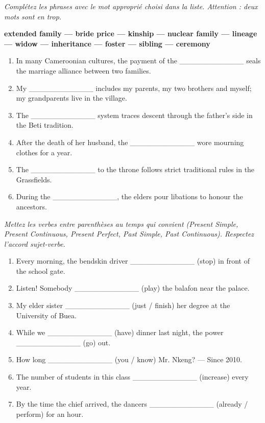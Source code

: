 \documentclass[11pt]{article}
\begin{document}
\begin{exercice}
\emph{Complétez les phrases avec le mot approprié choisi dans la liste. Attention : deux mots sont en trop.}
\begin{center}
\textbf{extended family — bride price — kinship — nuclear family — lineage — widow — inheritance — foster — sibling — ceremony}
\end{center}
\begin{enumerate}
    \item In many Cameroonian cultures, the payment of the \_\_\_\_\_\_\_\_\_\_\_\_ seals the marriage alliance between two families.
    \item My \_\_\_\_\_\_\_\_\_\_\_\_ includes my parents, my two brothers and myself; my grandparents live in the village.
    \item The \_\_\_\_\_\_\_\_\_\_\_\_ system traces descent through the father's side in the Beti tradition.
    \item After the death of her husband, the \_\_\_\_\_\_\_\_\_\_\_\_ wore mourning clothes for a year.
    \item The \_\_\_\_\_\_\_\_\_\_\_\_ to the throne follows strict traditional rules in the Grassfields.
    \item During the \_\_\_\_\_\_\_\_\_\_\_\_, the elders pour libations to honour the ancestors.
\end{enumerate}
\end{exercice}

\begin{exercice}
\emph{Mettez les verbes entre parenthèses au temps qui convient (Present Simple, Present Continuous, Present Perfect, Past Simple, Past Continuous). Respectez l'accord sujet-verbe.}
\begin{enumerate}
    \item Every morning, the bendskin driver \_\_\_\_\_\_\_\_\_\_\_\_ (stop) in front of the school gate.
    \item Listen! Somebody \_\_\_\_\_\_\_\_\_\_\_\_ (play) the balafon near the palace.
    \item My elder sister \_\_\_\_\_\_\_\_\_\_\_\_ (just / finish) her degree at the University of Buea.
    \item While we \_\_\_\_\_\_\_\_\_\_\_\_ (have) dinner last night, the power \_\_\_\_\_\_\_\_\_\_\_\_ (go) out.
    \item How long \_\_\_\_\_\_\_\_\_\_\_\_ (you / know) Mr. Nkeng? — Since 2010.
    \item The number of students in this class \_\_\_\_\_\_\_\_\_\_\_\_ (increase) every year.
    \item By the time the chief arrived, the dancers \_\_\_\_\_\_\_\_\_\_\_\_ (already / perform) for an hour.
\end{enumerate}
\end{exercice}
\end{document}
